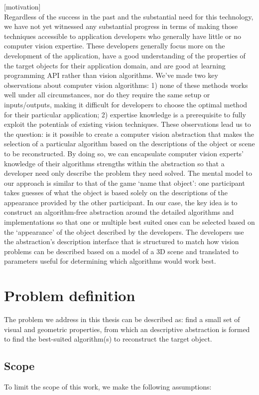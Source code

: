 [motivation]\\
Regardless of the success in the past and the substantial need for this technology, we have not yet witnessed any substantial progress in terms of making those techniques accessible to application developers who generally have little or no computer vision expertise. These developers generally focus more on the development of the application, have a good understanding of the properties of the target objects for their application domain, and are good at learning programming API rather than vision algorithms. We've made two key observations about computer vision algorithms: 1) none of these methods works well under all circumstances, nor do they require the same setup or inputs/outputs, making it difficult for developers to choose the optimal method for their particular application; 2) expertise knowledge is a prerequisite to fully exploit the potentials of existing vision techniques. These observations lead us to the question: is it possible to create a computer vision abstraction that makes the selection of a particular algorithm based on the descriptions of the object or scene to be reconstructed. By doing so, we can encapsulate computer vision experts' knowledge of their algorithms strengths within the abstraction so that a developer need only describe the problem they need solved. The mental model to our approach is similar to that of the game `name that object': one participant takes guesses of what the object is based solely on the descriptions of the appearance provided by the other participant. In our case, the key idea is to construct an algorithm-free abstraction around the detailed algorithms and implementations so that one or multiple best suited ones can be selected based on the `appearance' of the object described by the developers. The developers use the abstraction's description interface that is structured to match how vision problems can be described based on a model of a 3D scene and translated to parameters useful for determining which algorithms would work best.

\section{Problem definition}
The problem we address in this thesis can be described as: find a small set of visual and geometric properties, from which an descriptive abstraction is formed to find the best-suited algorithm(s) to reconstruct the target object.

\subsection{Scope}
To limit the scope of this work, we make the following assumptions:

